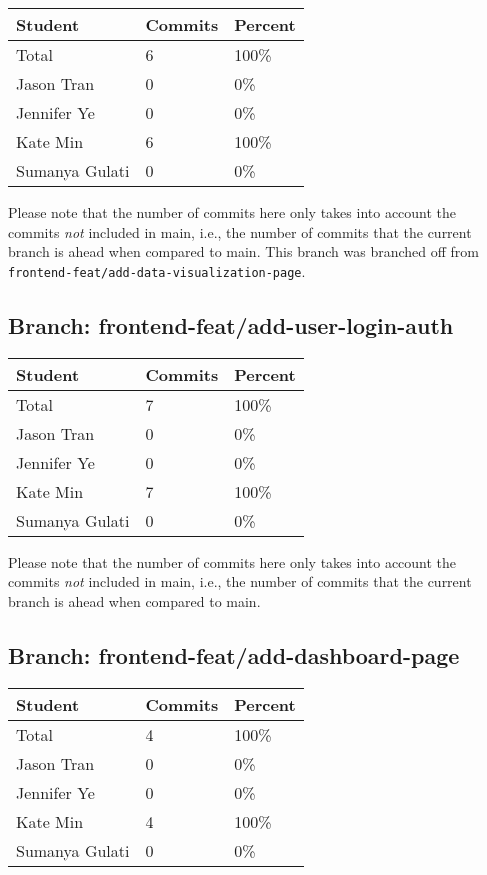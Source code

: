 \documentclass{article}
\begin{document}
\begin{table}[H]
\centering
\begin{tabular}{lll}
\toprule
\textbf{Student} & \textbf{Commits} & \textbf{Percent}\\
\midrule
Total & 6 & 100\% \\
Jason Tran & 0 & 0\% \\
Jennifer Ye & 0 & 0\% \\
Kate Min & 6 & 100\% \\
Sumanya Gulati & 0 & 0\% \\
\bottomrule
\end{tabular}
\end{table}

Please note that the number of commits here only takes into account the commits \emph{not}
included in main, i.e., the number of commits that the current branch is ahead when compared 
to main. This branch was branched off from
\texttt{frontend-feat/add-data-visualization-page}.

\subsection{Branch: frontend-feat/add-user-login-auth}

\begin{table}[H]
\centering
\begin{tabular}{lll}
\toprule
\textbf{Student} & \textbf{Commits} & \textbf{Percent}\\
\midrule
Total & 7 & 100\% \\
Jason Tran & 0 & 0\% \\
Jennifer Ye & 0 & 0\% \\
Kate Min & 7 & 100\% \\
Sumanya Gulati & 0 & 0\% \\
\bottomrule
\end{tabular}
\end{table}

Please note that the number of commits here only takes into account the commits \emph{not}
included in main, i.e., the number of commits that the current branch is ahead when compared 
to main.

\subsection{Branch: frontend-feat/add-dashboard-page}

\begin{table}[H]
\centering
\begin{tabular}{lll}
\toprule
\textbf{Student} & \textbf{Commits} & \textbf{Percent}\\
\midrule
Total & 4 & 100\% \\
Jason Tran & 0 & 0\% \\
Jennifer Ye & 0 & 0\% \\
Kate Min & 4 & 100\% \\
Sumanya Gulati & 0 & 0\% \\
\bottomrule
\end{tabular}
\end{table}
\end{document}
